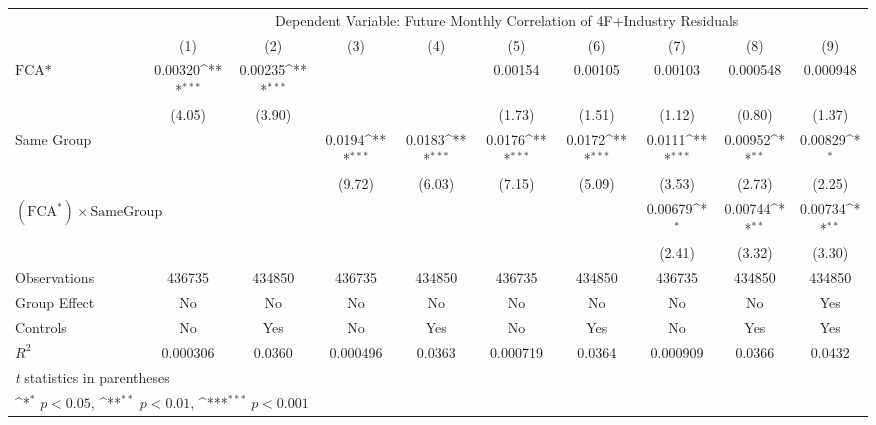 {
\def\sym#1{\ifmmode^{#1}\else\(^{#1}\)\fi}
\begin{tabular}{l*{9}{c}}
\hline\hline
                &\multicolumn{9}{c}{Dependent Variable: Future Monthly Correlation of 4F+Industry Residuals}                                                                               \\\cmidrule(lr){2-10}
                &\multicolumn{1}{c}{(1)}         &\multicolumn{1}{c}{(2)}         &\multicolumn{1}{c}{(3)}         &\multicolumn{1}{c}{(4)}         &\multicolumn{1}{c}{(5)}         &\multicolumn{1}{c}{(6)}         &\multicolumn{1}{c}{(7)}         &\multicolumn{1}{c}{(8)}         &\multicolumn{1}{c}{(9)}         \\
\hline
$ \text{FCA*} $ &  0.00320\sym{***}&  0.00235\sym{***}&                  &                  &  0.00154         &  0.00105         &  0.00103         & 0.000548         & 0.000948         \\
                &   (4.05)         &   (3.90)         &                  &                  &   (1.73)         &   (1.51)         &   (1.12)         &   (0.80)         &   (1.37)         \\
[1em]
Same Group      &                  &                  &   0.0194\sym{***}&   0.0183\sym{***}&   0.0176\sym{***}&   0.0172\sym{***}&   0.0111\sym{***}&  0.00952\sym{**} &  0.00829\sym{*}  \\
&                  &                  &   (9.72)         &   (6.03)         &   (7.15)         &   (5.09)         &   (3.53)         &   (2.73)         &   (2.25)         \\
[1em]
 $ (\text{FCA}^*) \times {\text{SameGroup} }  $ &                  &                  &                  &                  &                  &                  &  0.00679\sym{*}  &  0.00744\sym{**} &  0.00734\sym{**} \\
                &                  &                  &                  &                  &                  &                  &   (2.41)         &   (3.32)         &   (3.30)         \\
\hline
Observations    &   436735         &   434850         &   436735         &   434850         &   436735         &   434850         &   436735         &   434850         &   434850         \\
Group Effect    &       No         &       No         &       No         &       No         &       No         &       No         &       No         &       No         &      Yes         \\
Controls        &       No         &      Yes         &       No         &      Yes         &       No         &      Yes         &       No         &      Yes         &      Yes         \\
$ R^2 $         & 0.000306         &   0.0360         & 0.000496         &   0.0363         & 0.000719         &   0.0364         & 0.000909         &   0.0366         &   0.0432         \\
\hline\hline
\multicolumn{10}{l}{\footnotesize \textit{t} statistics in parentheses}\\
\multicolumn{10}{l}{\footnotesize \sym{*} \(p<0.05\), \sym{**} \(p<0.01\), \sym{***} \(p<0.001\)}\\
\end{tabular}
}

